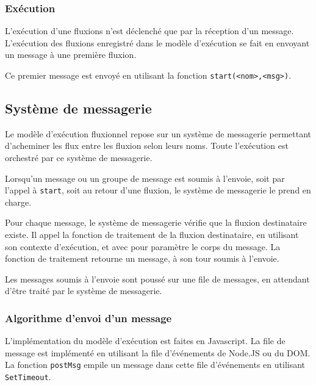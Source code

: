 \subsubsection{Exécution}

L'exécution d'une fluxions n'est déclenché que par la réception d'un message.
L'exécution des fluxions enregistré dans le modèle d'exécution se fait en envoyant un message à une première fluxion.

Ce premier message est envoyé en utilisant la fonction \texttt{start(<nom>,<msg>)}.



\subsection{Système de messagerie}

Le modèle d'exécution fluxionnel repose sur un système de messagerie permettant d'acheminer les flux entre les fluxion selon leurs noms.
Toute l'exécution est orchestré par ce système de messagerie.

Lorsqu'un message ou un groupe de message est soumis à l'envoie, soit par l'appel à \texttt{start}, soit au retour d'une fluxion, le système de messagerie le prend en charge.

Pour chaque message, le système de messagerie vérifie que la fluxion destinataire existe.
Il appel la fonction de traitement de la fluxion destinataire, en utilisant son contexte d'exécution, et avec pour paramètre le corps du message.
La fonction de traitement retourne un message, à son tour soumis à l'envoie.

Les messages soumis à l'envoie sont poussé sur une file de messages, en attendant d'être traité par le système de messagerie.

\subsubsection{Algorithme d'envoi d'un message}

L'implémentation du modèle d'exécution est faites en Javascript.
La file de message est implémenté en utilisant la file d'événements de Node.JS ou du DOM.
La fonction \texttt{postMsg} empile un message dans cette file d'événements en utilisant \texttt{SetTimeout}.

